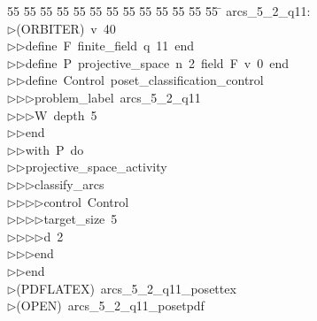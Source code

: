 %
%
\begin{tabbing}
55 \= 55 \= 55 \= 55 \= 55 \= 55 \= 55 \= 55 \= 55 \= 55 \= 55 \= 55 \= 55 \= \kill
arcs\_5\_2\_q11:\\[0pt]
$\triangleright$\>(ORBITER)\ v\ 40\ \\[0pt]
$\triangleright$\>$\triangleright$\>define\ F\ finite\_field\ q\ 11\ end\ \\[0pt]
$\triangleright$\>$\triangleright$\>define\ P\ projective\_space\ n\ 2\ field\ F\ v\ 0\ end\ \\[0pt]
$\triangleright$\>$\triangleright$\>define\ Control\ poset\_classification\_control\ \\[0pt]
$\triangleright$\>$\triangleright$\>$\triangleright$\>problem\_label\ arcs\_5\_2\_q11\ \\[0pt]
$\triangleright$\>$\triangleright$\>$\triangleright$\>W\ depth\ 5\ \\[0pt]
$\triangleright$\>$\triangleright$\>end\ \\[0pt]
$\triangleright$\>$\triangleright$\>with\ P\ do\ \\[0pt]
$\triangleright$\>$\triangleright$\>projective\_space\_activity\ \\[0pt]
$\triangleright$\>$\triangleright$\>$\triangleright$\>classify\_arcs\ \\[0pt]
$\triangleright$\>$\triangleright$\>$\triangleright$\>$\triangleright$\>control\ Control\ \\[0pt]
$\triangleright$\>$\triangleright$\>$\triangleright$\>$\triangleright$\>target\_size\ 5\ \\[0pt]
$\triangleright$\>$\triangleright$\>$\triangleright$\>$\triangleright$\>d\ 2\ \\[0pt]
$\triangleright$\>$\triangleright$\>$\triangleright$\>end\ \\[0pt]
$\triangleright$\>$\triangleright$\>end\\[0pt]
$\triangleright$\>(PDFLATEX)\ arcs\_5\_2\_q11\_posettex\\[0pt]
$\triangleright$\>(OPEN)\ arcs\_5\_2\_q11\_posetpdf\\[0pt]
\end{tabbing}

